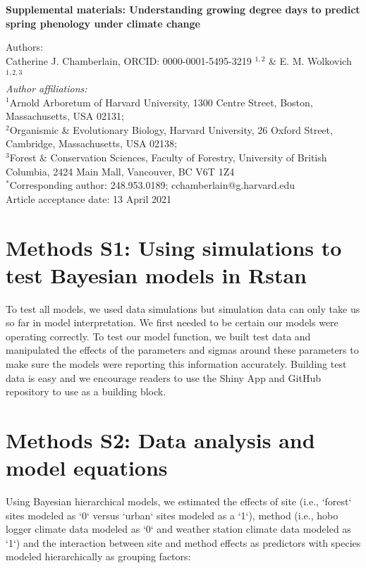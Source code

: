 \documentclass{article}\usepackage[]{graphicx}\usepackage[]{color}
\begin{document}
\noindent \textbf{\Large{Supplemental materials: Understanding growing degree days to predict spring phenology under climate change}}

\noindent Authors:\\
Catherine J. Chamberlain, ORCID: 0000-0001-5495-3219 $^{1,2}$ \& E. M. Wolkovich $^{1,2,3}$
\vspace{2ex}\\
\emph{Author affiliations:}\\
$^{1}$Arnold Arboretum of Harvard University, 1300 Centre Street, Boston, Massachusetts, USA 02131; \\
$^{2}$Organismic \& Evolutionary Biology, Harvard University, 26 Oxford Street, Cambridge, Massachusetts, USA 02138; \\
$^{3}$Forest \& Conservation Sciences, Faculty of Forestry, University of British Columbia, 2424 Main Mall, Vancouver, BC V6T 1Z4\\
\vspace{2ex}
$^*$Corresponding author: 248.953.0189; cchamberlain@g.harvard.edu\\
\vspace{2ex}
Article acceptance date: 13 April 2021

\renewcommand{\thetable}{S\arabic{table}}
\renewcommand{\thefigure}{S\arabic{figure}}
\renewcommand{\labelitemi}{$-$}



\section*{Methods S1: Using simulations to test Bayesian models in Rstan}
To test all models, we used data simulations but simulation data can only take us so far in model interpretation. We first needed to be certain our models were operating correctly. To test our model function, we built test data and manipulated the effects of the parameters and sigmas around these parameters to make sure the models were reporting this information accurately. Building test data is easy and we encourage readers to use the Shiny App and GitHub repository to use as a building block. 

\section*{Methods S2: Data analysis and model equations}
Using Bayesian hierarchical models, we estimated the effects of site (i.e., `forest` sites modeled as `0` versus `urban` sites modeled as a `1`), method (i.e., hobo logger climate data modeled as `0` and weather station climate data modeled as `1`) and the interaction between site and method effects as predictors with species modeled hierarchically as grouping factors:
\end{document}

